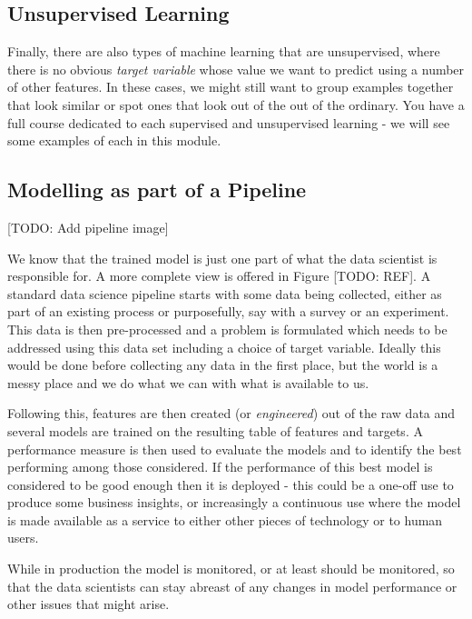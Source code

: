 \documentclass[
]{book}
\theoremstyle{definition}
\theoremstyle{definition}
\theoremstyle{definition}
\theoremstyle{definition}
\theoremstyle{remark}
\begin{document}
\hypertarget{unsupervised-learning}{%
\subsection{Unsupervised Learning}\label{unsupervised-learning}}

Finally, there are also types of machine learning that are unsupervised, where there is no obvious \emph{target variable} whose value we want to predict using a number of other features. In these cases, we might still want to group examples together that look similar or spot ones that look out of the out of the ordinary. You have a full course dedicated to each supervised and unsupervised learning - we will see some examples of each in this module.

\hypertarget{modelling-as-part-of-a-pipeline}{%
\subsection{Modelling as part of a Pipeline}\label{modelling-as-part-of-a-pipeline}}

{[}TODO: Add pipeline image{]}

We know that the trained model is just one part of what the data scientist is responsible for. A more complete view is offered in Figure {[}TODO: REF{]}. A standard data science pipeline starts with some data being collected, either as part of an existing process or purposefully, say with a survey or an experiment. This data is then pre-processed and a problem is formulated which needs to be addressed using this data set including a choice of target variable. Ideally this would be done before collecting any data in the first place, but the world is a messy place and we do what we can with what is available to us.

Following this, features are then created (or \emph{engineered}) out of the raw data and several models are trained on the resulting table of features and targets. A performance measure is then used to evaluate the models and to identify the best performing among those considered. If the performance of this best model is considered to be good enough then it is deployed - this could be a one-off use to produce some business insights, or increasingly a continuous use where the model is made available as a service to either other pieces of technology or to human users.

While in production the model is monitored, or at least should be monitored, so that the data scientists can stay abreast of any changes in model performance or other issues that might arise.
\end{document}
